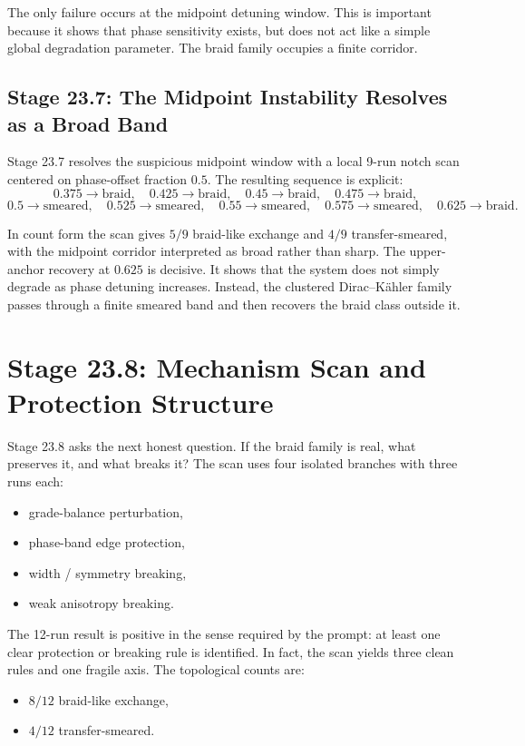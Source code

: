 \documentclass[11pt]{article}
\begin{document}
The only failure occurs at the midpoint detuning window. This is important because it shows that phase sensitivity exists, but does not act like a simple global degradation parameter. The braid family occupies a finite corridor.

\subsection{Stage 23.7: The Midpoint Instability Resolves as a Broad Band}

Stage 23.7 resolves the suspicious midpoint window with a local 9-run notch scan centered on phase-offset fraction $0.5$. The resulting sequence is explicit:
\[
0.375 \rightarrow \text{braid}, \quad
0.425 \rightarrow \text{braid}, \quad
0.45 \rightarrow \text{braid}, \quad
0.475 \rightarrow \text{braid},
\]
\[
0.5 \rightarrow \text{smeared}, \quad
0.525 \rightarrow \text{smeared}, \quad
0.55 \rightarrow \text{smeared}, \quad
0.575 \rightarrow \text{smeared}, \quad
0.625 \rightarrow \text{braid}.
\]

In count form the scan gives $5/9$ braid-like exchange and $4/9$ transfer-smeared, with the midpoint corridor interpreted as broad rather than sharp. The upper-anchor recovery at $0.625$ is decisive. It shows that the system does not simply degrade as phase detuning increases. Instead, the clustered Dirac--K\"ahler family passes through a finite smeared band and then recovers the braid class outside it.

\section{Stage 23.8: Mechanism Scan and Protection Structure}

Stage 23.8 asks the next honest question. If the braid family is real, what preserves it, and what breaks it? The scan uses four isolated branches with three runs each:
\begin{itemize}
\item grade-balance perturbation,
\item phase-band edge protection,
\item width / symmetry breaking,
\item weak anisotropy breaking.
\end{itemize}

The 12-run result is positive in the sense required by the prompt: at least one clear protection or breaking rule is identified. In fact, the scan yields three clean rules and one fragile axis. The topological counts are:
\begin{itemize}
\item $8/12$ braid-like exchange,
\item $4/12$ transfer-smeared.
\end{itemize}
\end{document}
